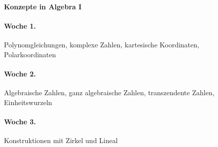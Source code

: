 \documentclass{../algblatt}
\begin{document}
\begin{center}\huge \textsf{\textbf{Konzepte in Algebra I}}\end{center}


\paragraph{Woche 1.} Polynomgleichungen, komplexe Zahlen, kartesische
Koordinaten, Polarkoordinaten

\paragraph{Woche 2.} Algebraische Zahlen, ganz algebraische Zahlen,
transzendente Zahlen, Einheitswurzeln

\paragraph{Woche 3.} Konstruktionen mit Zirkel und Lineal

\end{document}

